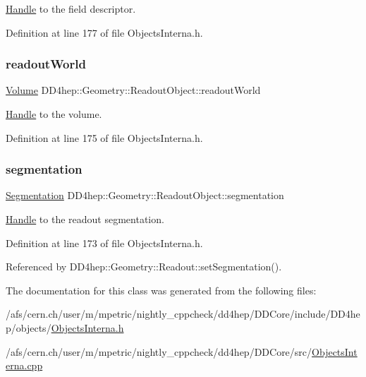 \hyperlink{class_d_d4hep_1_1_handle}{Handle} to the field descriptor. 



Definition at line 177 of file Objects\+Interna.\+h.

\hypertarget{class_d_d4hep_1_1_geometry_1_1_readout_object_ac4b6fc2857d2794caa59a544de8b2579}{}\label{class_d_d4hep_1_1_geometry_1_1_readout_object_ac4b6fc2857d2794caa59a544de8b2579} 
\subsubsection{\texorpdfstring{readout\+World}{readoutWorld}}
{\footnotesize\ttfamily \hyperlink{class_d_d4hep_1_1_geometry_1_1_volume}{Volume} D\+D4hep\+::\+Geometry\+::\+Readout\+Object\+::readout\+World}



\hyperlink{class_d_d4hep_1_1_handle}{Handle} to the volume. 



Definition at line 175 of file Objects\+Interna.\+h.

\hypertarget{class_d_d4hep_1_1_geometry_1_1_readout_object_ac9e7bca00d99bd317bdd942c9ab132d5}{}\label{class_d_d4hep_1_1_geometry_1_1_readout_object_ac9e7bca00d99bd317bdd942c9ab132d5} 
\subsubsection{\texorpdfstring{segmentation}{segmentation}}
{\footnotesize\ttfamily \hyperlink{class_d_d4hep_1_1_geometry_1_1_segmentation}{Segmentation} D\+D4hep\+::\+Geometry\+::\+Readout\+Object\+::segmentation}



\hyperlink{class_d_d4hep_1_1_handle}{Handle} to the readout segmentation. 



Definition at line 173 of file Objects\+Interna.\+h.



Referenced by D\+D4hep\+::\+Geometry\+::\+Readout\+::set\+Segmentation().



The documentation for this class was generated from the following files\+:\begin{DoxyCompactItemize}
\item 
/afs/cern.\+ch/user/m/mpetric/nightly\+\_\+cppcheck/dd4hep/\+D\+D\+Core/include/\+D\+D4hep/objects/\hyperlink{_objects_interna_8h}{Objects\+Interna.\+h}\item 
/afs/cern.\+ch/user/m/mpetric/nightly\+\_\+cppcheck/dd4hep/\+D\+D\+Core/src/\hyperlink{_objects_interna_8cpp}{Objects\+Interna.\+cpp}\end{DoxyCompactItemize}

